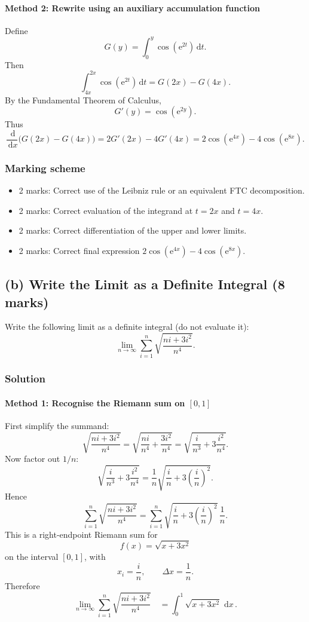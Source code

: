 \documentclass[12pt]{article}
\newcommand{\dd}{\,\mathrm{d}}
\newcommand{\ee}{\mathrm{e}}
\begin{document}
\paragraph{Method 2: Rewrite using an auxiliary accumulation function}
Define
\[
G(y)=\int_0^y \cos\!\left(\ee^{2t}\right)\dd t.
\]
Then
\[
\int_{4x}^{2x}\cos\!\left(\ee^{2t}\right)\dd t
=G(2x)-G(4x).
\]
By the Fundamental Theorem of Calculus,
\[
G'(y)=\cos\!\left(\ee^{2y}\right).
\]
Thus
\[
\frac{\dd}{\dd x}\bigl(G(2x)-G(4x)\bigr)
=2G'(2x)-4G'(4x)
\boxed{=2\cos\!\left(\ee^{4x}\right)-4\cos\!\left(\ee^{8x}\right).}
\]


\subsubsection{Marking scheme}
\begin{itemize}
\item 2 marks: Correct use of the Leibniz rule or an equivalent FTC decomposition.
\item 2 marks: Correct evaluation of the integrand at \(t=2x\) and \(t=4x\).
\item 2 marks: Correct differentiation of the upper and lower limits.
\item 2 marks: Correct final expression \(2\cos(\ee^{4x})-4\cos(\ee^{8x})\).
\end{itemize}

\subsection{(b) Write the Limit as a Definite Integral \hfill (8 marks)}

Write the following limit as a definite integral (do not evaluate it):
\[
\lim_{n\to\infty}\sum_{i=1}^{n}\sqrt{\frac{ni+3i^2}{n^4}}.
\]

\subsubsection{Solution}

\paragraph{Method 1: Recognise the Riemann sum on \([0,1]\)}
First simplify the summand:
\[
\sqrt{\frac{ni+3i^2}{n^4}}
=\sqrt{\frac{ni}{n^4}+\frac{3i^2}{n^4}}
=\sqrt{\frac{i}{n^3}+3\frac{i^2}{n^4}}.
\]
Now factor out \(1/n\):
\[
\sqrt{\frac{i}{n^3}+3\frac{i^2}{n^4}}
=\frac{1}{n}\sqrt{\frac{i}{n}+3\left(\frac{i}{n}\right)^2}.
\]
Hence
\[
\sum_{i=1}^{n}\sqrt{\frac{ni+3i^2}{n^4}}
=\sum_{i=1}^{n}\sqrt{\frac{i}{n}+3\left(\frac{i}{n}\right)^2}\,\frac{1}{n}.
\]
This is a right-endpoint Riemann sum for
\[
f(x)=\sqrt{x+3x^2}
\]
on the interval \([0,1]\), with
\[
x_i=\frac{i}{n},\qquad \Delta x=\frac{1}{n}.
\]
Therefore
\[
\lim_{n\to\infty}\sum_{i=1}^{n}\sqrt{\frac{ni+3i^2}{n^4}}
\quad \boxed{=\int_0^1 \sqrt{x+3x^2}\,\dd x}\,.
\]
\end{document}
